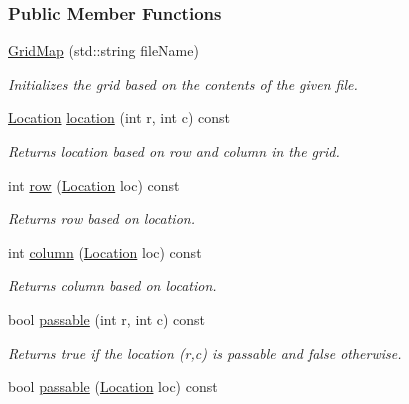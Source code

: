 \subsubsection*{Public Member Functions}
\begin{DoxyCompactItemize}
\item 
\hyperlink{structsb_1_1GridMap_aa1e076d61a190408cdea00156215ec6a}{Grid\+Map} (std\+::string file\+Name)
\begin{DoxyCompactList}\small\item\em Initializes the grid based on the contents of the given file. \end{DoxyCompactList}\item 
\hyperlink{structsb_1_1GridMap_aae073ca1668a117e37279473fff789d1}{Location} \hyperlink{structsb_1_1GridMap_af1f0641e6445bc37766d044a8f51f6ac}{location} (int r, int c) const 
\begin{DoxyCompactList}\small\item\em Returns location based on row and column in the grid. \end{DoxyCompactList}\item 
int \hyperlink{structsb_1_1GridMap_a7970dc76755e8d95b2e575869d36d992}{row} (\hyperlink{structsb_1_1GridMap_aae073ca1668a117e37279473fff789d1}{Location} loc) const 
\begin{DoxyCompactList}\small\item\em Returns row based on location. \end{DoxyCompactList}\item 
int \hyperlink{structsb_1_1GridMap_a03beeeda7ee556b99d4e85dc1e0ed2c9}{column} (\hyperlink{structsb_1_1GridMap_aae073ca1668a117e37279473fff789d1}{Location} loc) const 
\begin{DoxyCompactList}\small\item\em Returns column based on location. \end{DoxyCompactList}\item 
bool \hyperlink{structsb_1_1GridMap_a681bd008d3a1dc58a36ae130655bc5ed}{passable} (int r, int c) const 
\begin{DoxyCompactList}\small\item\em Returns {\ttfamily true} if the location {\ttfamily }(r,c) is passable and {\ttfamily false} otherwise. \end{DoxyCompactList}\item 
bool \hyperlink{structsb_1_1GridMap_a26f16a15aa89acd74da91403b86a18a1}{passable} (\hyperlink{structsb_1_1GridMap_aae073ca1668a117e37279473fff789d1}{Location} loc) const 

\end{DoxyCompactItemize}
